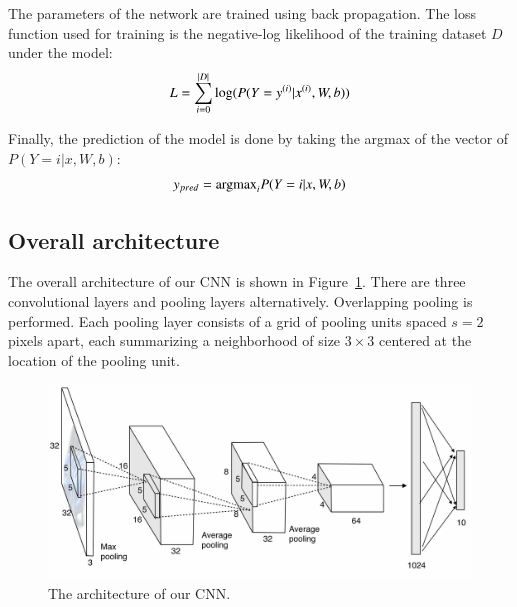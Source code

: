 \documentclass{article} %
\begin{document}
\par
The parameters of the network are trained using back propagation\cite{backprop}. The loss function used for training is the negative-log likelihood of the training dataset $D$ under the model:
\begin{equation}
L = \sum_{i=0}^{|D|}\textup{log}(P(Y=y^{(i)}|x^{(i)},W,b))
\end{equation}
\par
Finally, the prediction of the model is done by taking the argmax of the vector of $P(Y=i|x,W,b)$:
\begin{equation}
y_{pred}=\textup{argmax}_{i}P(Y=i|x,W,b)
\end{equation}

\subsection{Overall architecture}
The overall architecture of our CNN is shown in Figure~\ref{fig1}. There are three convolutional layers and pooling layers alternatively. Overlapping pooling is performed. Each pooling layer consists of a grid of pooling units spaced $s=2$ pixels apart, each summarizing a neighborhood of size $3\times3$ centered at the location of the pooling unit.

\begin{figure}
\centering
\includegraphics[width=1\textwidth]{architecture}
\caption{The architecture of our CNN.}
\label{fig1}
\end{figure}
\end{document}
